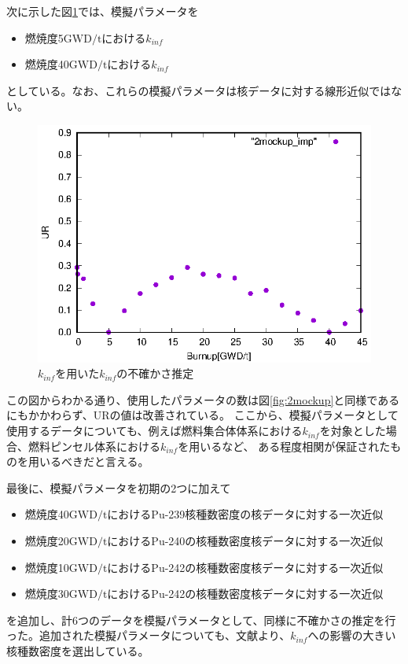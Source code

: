 \documentclass[a4paper,11pt,titlepage,uplatex]{jsreport}
\begin{document}
次に示した図\ref{fig:2mockup_imp}では、模擬パラメータを
\begin{itemize}
  \item 燃焼度5$\mathrm{GWD/t}$における$k_{inf}$
  \item 燃焼度40$\mathrm{GWD/t}$における$k_{inf}$
\end{itemize}
としている。なお、これらの模擬パラメータは核データに対する線形近似ではない。

\begin{figure}[H]
  \centering
  \includegraphics{2mockup_imp.eps}
  \caption{$k_{inf}$を用いた$k_{inf}$の不確かさ推定}
  \label{fig:2mockup_imp}
\end{figure}
この図からわかる通り、使用したパラメータの数は図\ref{fig:2mockup}と同様であるにもかかわらず、URの値は改善されている。
ここから、模擬パラメータとして使用するデータについても、例えば燃料集合体体系における$k_{inf}$を対象とした場合、燃料ピンセル体系における$k_{inf}$を用いるなど、
ある程度相関が保証されたものを用いるべきだと言える。

最後に、模擬パラメータを初期の2つに加えて
\begin{itemize}
  \item 燃焼度40$\mathrm{GWD/t}$におけるPu-239核種数密度の核データに対する一次近似
  \item 燃焼度20$\mathrm{GWD/t}$におけるPu-240の核種数密度核データに対する一次近似
  \item 燃焼度10$\mathrm{GWD/t}$におけるPu-242の核種数密度核データに対する一次近似
  \item 燃焼度30$\mathrm{GWD/t}$におけるPu-242の核種数密度核データに対する一次近似
\end{itemize}
を追加し、計6つのデータを模擬パラメータとして、同様に不確かさの推定を行った。追加された模擬パラメータについても、文献\cite{Harada}より、$k_{inf}$への影響の大きい核種数密度を選出している。
\end{document}
